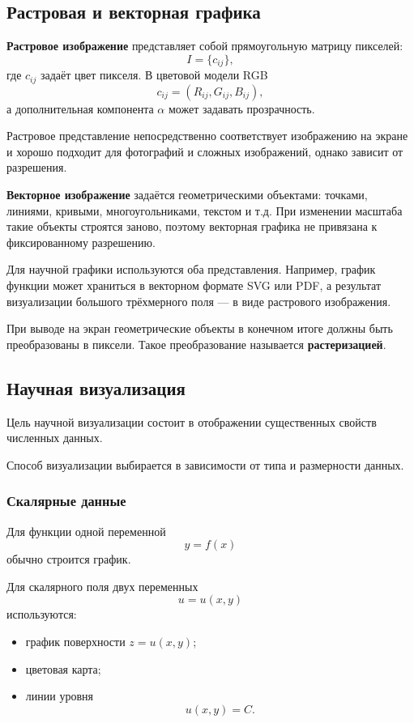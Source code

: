\subsection{Растровая и векторная графика}

\textbf{Растровое изображение} представляет собой прямоугольную матрицу пикселей:
\[
I=\{c_{ij}\},
\]
где $c_{ij}$ задаёт цвет пикселя. В цветовой модели RGB
\[
c_{ij}=(R_{ij},G_{ij},B_{ij}),
\]
а дополнительная компонента $\alpha$ может задавать прозрачность.

Растровое представление непосредственно соответствует изображению на экране и хорошо подходит для фотографий и сложных изображений, однако зависит от разрешения.

\textbf{Векторное изображение} задаётся геометрическими объектами: точками, линиями, кривыми, многоугольниками, текстом и т.д. При изменении масштаба такие объекты строятся заново, поэтому векторная графика не привязана к фиксированному разрешению.

Для научной графики используются оба представления. Например, график функции может храниться в векторном формате SVG или PDF, а результат визуализации большого трёхмерного поля --- в виде растрового изображения.

При выводе на экран геометрические объекты в конечном итоге должны быть преобразованы в пиксели. Такое преобразование называется \textbf{растеризацией}.

\subsection{Научная визуализация}

Цель научной визуализации состоит в отображении существенных свойств численных данных.

Способ визуализации выбирается в зависимости от типа и размерности данных.

\subsubsection*{Скалярные данные}

Для функции одной переменной
\[
y=f(x)
\]
обычно строится график.

Для скалярного поля двух переменных
\[
u=u(x,y)
\]
используются:
\begin{itemize}
	\item график поверхности $z=u(x,y)$;
	\item цветовая карта;
	\item линии уровня
	\[
	u(x,y)=C.
	\]
\end{itemize}

